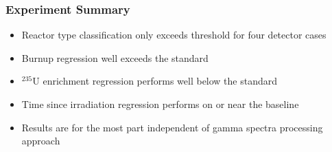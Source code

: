\begin{frame}
  \frametitle{Experiment Summary}
  \begin{itemize}
    \item Reactor type classification only exceeds threshold for four detector
    cases
    \item Burnup regression well exceeds the standard
    \item ${}^{235}\text{U}$ enrichment regression performs well below the
    standard
    \item Time since irradiation regression performs on or near the baseline
    \item Results are for the most part independent of gamma spectra processing 
    approach
  \end{itemize}
\end{frame}

